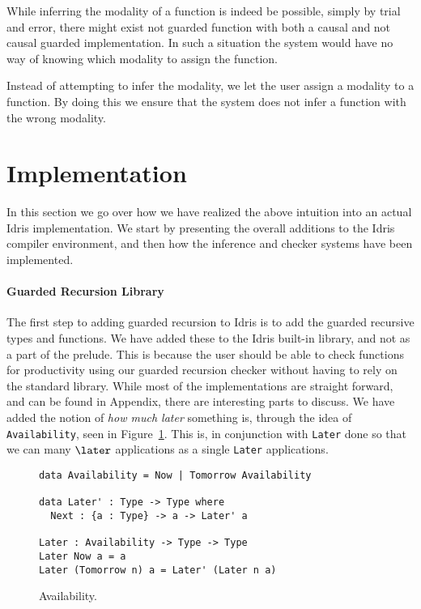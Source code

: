 While inferring the modality of a function is indeed be possible, simply by
trial and error, there might exist not guarded function with both a causal and
not causal guarded implementation. In such a situation the system would have no
way of knowing which modality to assign the function.

Instead of attempting to infer the modality, we let the user assign a modality
to a function. By doing this we ensure that the system does not infer a function
with the wrong modality.

\section{Implementation}
In this section we go over how we have realized the above intuition into an
actual Idris implementation. We start by presenting the overall additions to the
Idris compiler environment, and then how the inference and checker systems have
been implemented.

\paragraph{Guarded Recursion Library}
The first step to adding guarded recursion to Idris is to add the guarded
recursive types and functions. We have added these to the Idris built-in
library, and not as a part of the prelude. This is because the user should be
able to check functions for productivity using our guarded recursion checker
without having to rely on the standard library.  While most of the
implementations are straight forward, and can be found in Appendix, there are interesting parts to discuss. We
have added the notion of \emph{how much later} something is, through the idea of
\texttt{Availability}, seen in Figure~\ref{fig:availability}. This is, in
conjunction with \texttt{Later} done so that we can many $\later$ applications
as a single \texttt{Later} applications.

\begin{figure}[h]
  \begin{lstlisting}[mathescape]
data Availability = Now | Tomorrow Availability

data Later' : Type -> Type where
  Next : {a : Type} -> a -> Later' a

Later : Availability -> Type -> Type
Later Now a = a
Later (Tomorrow n) a = Later' (Later n a)
\end{lstlisting}
  \caption{Availability.}
  \label{fig:availability}
\end{figure}

